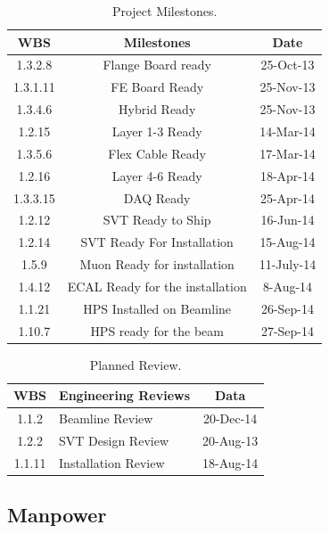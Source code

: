 \begin{table}[htdp]
\caption{Project Milestones.}
\begin{center}
\begin{tabular}{|c|c|c|}
\hline
WBS & Milestones & Date\\
\hline\hline
1.3.2.8	&Flange Board ready	&25-Oct-13\\
\hline
1.3.1.11	&FE Board Ready&	25-Nov-13\\
\hline
1.3.4.6	&Hybrid Ready	&25-Nov-13\\
\hline
1.2.15	&Layer 1-3 Ready	&14-Mar-14 \\
\hline
1.3.5.6	&Flex Cable Ready	&17-Mar-14 \\
\hline
1.2.16	&Layer 4-6 Ready	&18-Apr-14 \\
\hline
1.3.3.15&	DAQ Ready	&25-Apr-14 \\
\hline
1.2.12&	SVT Ready to Ship	&16-Jun-14\\
\hline
1.2.14&	SVT Ready For Installation&	15-Aug-14\\
\hline
1.5.9	&Muon Ready for installation&	11-July-14\\
\hline
1.4.12&	ECAL Ready for the installation&	8-Aug-14\\
\hline
1.1.21&HPS Installed on Beamline&26-Sep-14 \\
\hline
1.10.7&	HPS ready for the beam&	27-Sep-14\\
\hline
\hline
\end{tabular}
\end{center}
\label{tb:milestones}
\end{table}%

\begin{table}[htdp]
\caption{Planned Review.}
\begin{center}
\begin{tabular}{|c|l|c|}
\hline
WBS&Engineering Reviews& Data\\
\hline
\hline
1.1.2 &	Beamline  Review&	20-Dec-14\\
\hline
1.2.2	&SVT Design Review	&20-Aug-13\\
\hline
1.1.11&	Installation Review	&18-Aug-14\\
\hline
\hline
\end{tabular}
\end{center}
\label{tb:reviews}
\end{table}%

\subsection{Manpower}

